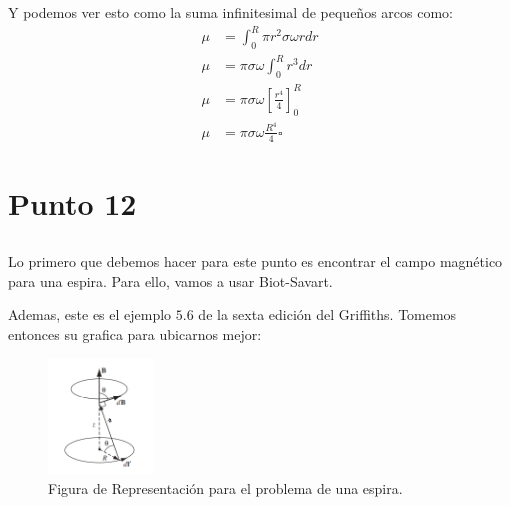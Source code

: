 \documentclass{report}
\begin{document}
Y podemos ver esto como la suma infinitesimal de pequeños arcos como:
\begin{align*}
	\mu &= \int_0^R \pi r^2 \sigma \omega r dr\\
	\mu &= \pi \sigma \omega \int_0^R r^3 dr\\
	\mu &= \pi \sigma \omega \left[ \frac{r^4}{4} \right]_0^R\\
	\mu &= \pi \sigma \omega \frac{R^4}{4} \square
\end{align*}

\chapter{Punto 12}

\section{}

Lo primero que debemos hacer para este punto es encontrar el campo magnético para una espira. Para ello, vamos a usar Biot-Savart.


Ademas, este es el ejemplo $5.6$ de la sexta edición del Griffiths. Tomemos entonces su grafica para ubicarnos mejor:

\begin{figure}[h]
	\begin{center}
		\includegraphics[width=0.25\textwidth]{img/book_5_21.png}
	\end{center}
	\caption{Figura de Representación para el problema de una espira.}\label{fig:Fig_5_21}
\end{figure}
\end{document}
